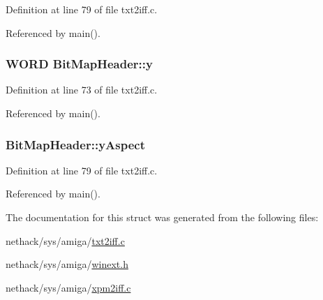 Definition at line 79 of file txt2iff.\+c.



Referenced by main().

\hypertarget{structBitMapHeader_a5abfd91fa563f69f77555e151292c431}{
\subsubsection[{y}]{\setlength{\rightskip}{0pt plus 5cm}W\+O\+R\+D Bit\+Map\+Header\+::y}}\label{structBitMapHeader_a5abfd91fa563f69f77555e151292c431}


Definition at line 73 of file txt2iff.\+c.



Referenced by main().

\hypertarget{structBitMapHeader_a088a85e003b0f93b333c364c92d7b002}{
\subsubsection[{y\+Aspect}]{ Bit\+Map\+Header\+::y\+Aspect}}\label{structBitMapHeader_a088a85e003b0f93b333c364c92d7b002}


Definition at line 79 of file txt2iff.\+c.



Referenced by main().



The documentation for this struct was generated from the following files\+:\begin{DoxyCompactItemize}
\item 
nethack/sys/amiga/\hyperlink{txt2iff_8c}{txt2iff.\+c}\item 
nethack/sys/amiga/\hyperlink{winext_8h}{winext.\+h}\item 
nethack/sys/amiga/\hyperlink{xpm2iff_8c}{xpm2iff.\+c}\end{DoxyCompactItemize}
